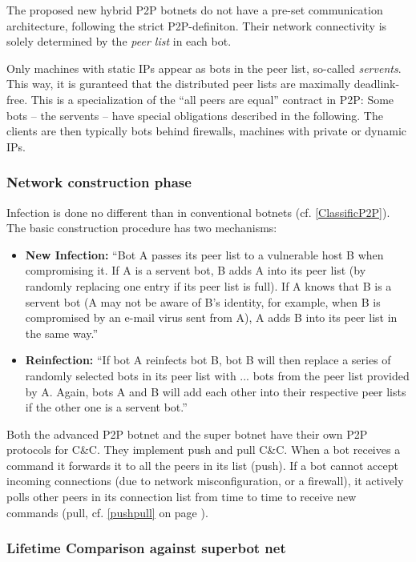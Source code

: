 \documentclass{llncs}
\begin{document}
The proposed new hybrid P2P botnets do not have a pre-set
communication architecture, following the strict P2P-definiton. Their
network connectivity is solely determined by the {\it peer list} in each
bot.  

Only machines with static IPs appear as bots in the peer list, so-called {\it
  servents}. This way, it is guranteed that the distributed peer lists
are maximally deadlink-free.  This is a specialization of the ``all
peers are equal'' contract in P2P: Some bots -- the servents -- have
special obligations described in the following.  The clients are then
typically bots behind firewalls, machines with private or dynamic IPs.

\subsubsection{Network construction phase}

Infection is done no different than in conventional botnets
(cf. \ref{ClassificP2P}). The basic construction procedure has two
mechanisms:
\begin{itemize}
\item {\bf New Infection:} ``Bot A passes its peer list to a
vulnerable host B when compromising it. If A is a
servent bot, B adds A into its peer list (by randomly
replacing one entry if its peer list is full). If A knows
that B is a servent bot (A may not be aware of
B’s identity, for example, when B is compromised by
an e-mail virus sent from A), A adds B into its peer
list in the same way.'' \cite{td1sc}
\item {\bf Reinfection:} ``If bot A
reinfects bot B, bot B will then replace \lbrack{}a series of\rbrack{} 
 randomly selected bots in its peer list with \lbrack{}...\rbrack{} bots
from the peer list provided by A. Again, bots A and B
will add each other into their respective peer lists if
the other one is a servent bot.''\cite{td1sc}
\end{itemize}

Both the advanced P2P botnet and the super botnet have their own P2P
protocols for C\&C. They implement push and pull
C\&C.\cite{wang2009systematic} When a bot receives a command it
forwards it to all the peers in its list (push). If a bot cannot
accept incoming connections (due to network misconfiguration, or a
firewall), it actively polls other peers in its connection list from
time to time to receive new commands (pull, cf. \ref{pushpull} on page
\pageref{pushpull}).

\subsubsection{Lifetime Comparison against superbot net}
\end{document}
